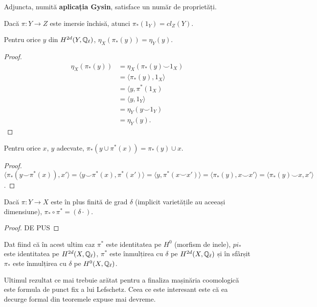 \documentclass[13pt,openany]{book}
\begin{document}
Adjuncta, numită {\bf aplicația Gysin}, satisface un număr de proprietăți.

\begin{propr}
Dacă $\pi : Y \rightarrow Z$ este imersie închisă, atunci $\pi_*(1_Y)=cl_Z(Y)$.
\end{propr}

\begin{propr}
Pentru orice $y$ din $H^{2d}(Y,\mathbb{Q}_\ell)$, $\eta_X(\pi_*(y))=\eta_Y(y)$.
\end{propr}

\begin{proof}
\begin{align*}
\eta_X(\pi_*(y))&=\eta_X(\pi_*(y)\smile 1_X)\\
&=\langle \pi_*(y), 1_X \rangle \\
&= \langle y, \pi^*(1_X) \\
&= \langle y, 1_Y \rangle \\
&= \eta_Y (y \smile 1_Y) \\
&= \eta_Y(y).
\end{align*}
\end{proof}

\begin{propr}
Pentru orice $x$, $y$ adecvate, $\pi_*(y \cup \pi^*(x)) = \pi_*(y) \cup x$.
\end{propr}

\begin{proof}
$\langle \pi_*(y \smile \pi^*(x)), x' \rangle = \langle y \smile \pi^*(x), \pi^*(x') \rangle = \langle y, \pi^*(x \smile x') \rangle = \langle \pi_*(y),x\smile x' \rangle = \langle \pi_*(y) \smile x, x' \rangle$.
\end{proof}

\begin{propr}
Dacă $\pi:Y \rightarrow X$ este în plus finită de grad $\delta$ (implicit varietățile au aceeași dimensiune), $\pi_* \circ \pi^* = (\delta \cdot)$.
\end{propr}

\begin{proof}
DE PUS
\end{proof}

Dat fiind că în acest ultim caz $\pi^*$ este identitatea pe $H^0$ (morfism de inele), $pi_*$ este identitatea pe $H^{2d}(X,\mathbb{Q}_\ell)$, $\pi^*$ este înmulțirea cu $\delta$ pe $H^{2d}(X,\mathbb{Q}_\ell)$ și în sfârșit $\pi_*$ este înmulțirea cu $\delta$ pe $H^0(X,\mathbb{Q}_\ell)$.

Ultimul rezultat ce mai trebuie arătat pentru a finaliza mașinăria coomologică este formula de punct fix a lui Lefschetz. Ceea ce este interesant este că ea decurge formal din teoremele expuse mai devreme.
\end{document}
